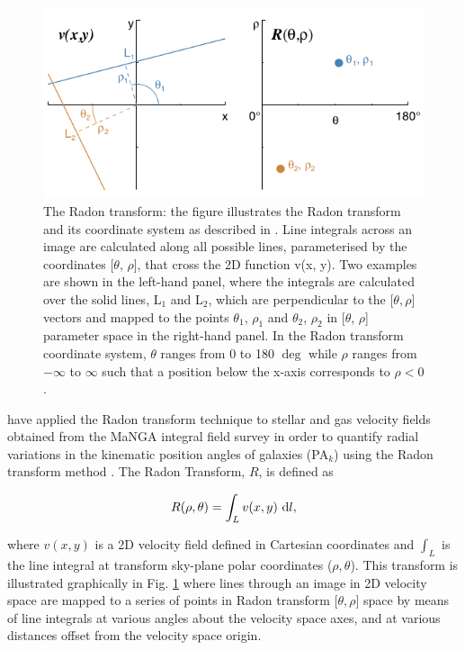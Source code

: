 \begin{figure}[h]
    \centering
    \includegraphics[width=\columnwidth]{images/RadonPlots/Radon-transform-Stark.png}
    \caption{The Radon transform: the figure illustrates the Radon transform and its coordinate system as described in \citet{2018MNRAS.480.2217S}. Line integrals across an image are calculated along all possible lines, parameterised by the coordinates [$\theta$, $\rho$], that cross the 2D function v(x, y). Two examples are shown in the left-hand panel, where the integrals are calculated over the solid lines, L$_1$ and L$_2$, which are perpendicular to the [$\theta, \rho$] vectors and mapped to the points $\theta_1$, $\rho_1$ and $\theta_2$, $\rho_2$ in [$\theta$, $\rho$] parameter space in the right-hand panel. In the Radon transform coordinate system, $\theta$ ranges from 0 to 180 $\deg$ while $\rho$ ranges from $-\infty$ to $\infty$  such that a position below the x-axis corresponds to $\rho < 0$.}
    \label{fig:RadonTransform}
\end{figure}

\citet{2018MNRAS.480.2217S} have applied the Radon transform technique to stellar and gas velocity fields obtained from the MaNGA integral field survey in order to quantify radial variations in the kinematic position angles of galaxies (PA$_k$) using the Radon transform method \citep[see e.g.][]{radon1917determination, 7910dc8d5b654c90ac4bc94c67d06f01}. 
The Radon Transform, $R$, is defined as

\begin{equation}
    \label{eqn:radon}
    R(\rho,\theta)=\int_{L}{v(x,y)\, \mathop{}\!\mathrm{d} l},
\end{equation}

where $v(x,y)$ is a 2D velocity field defined in Cartesian coordinates and $\int_{L}$ is the line integral at transform sky-plane polar coordinates ($\rho,\theta$). This transform is illustrated graphically in Fig. \ref{fig:RadonTransform} where lines through an image in 2D velocity space are mapped to a series of points in Radon transform [$\theta,\rho$] space by means of line integrals at various angles about the velocity space axes, and at various distances offset from the velocity space origin. 

